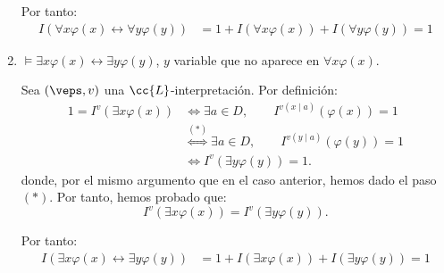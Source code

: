 \begin{ejercicio}
\begin{enumerate}
        Por tanto:
        \begin{align*}
            I( \forall x \varphi(x) \leftrightarrow \forall y \varphi(y))
            &= 1+I(\forall x \varphi(x))+I(\forall y \varphi(y))=1
        \end{align*}
        \item $\models \exists x \varphi(x) \leftrightarrow \exists y \varphi(y)$, $y$ variable que no aparece en $\forall x \varphi(x)$.
        
        
        Sea $(\veps,v)$ una $\cc{L}$-interpretación. Por definición:
        \begin{align*}
            1 = I^v(\exists x \varphi(x))
            &\iff \exists a\in D,\qquad I^{v(x\mid a)}(\varphi(x)) = 1\\
            &\stackrel{(\ast)}{\iff} \exists a\in D,\qquad I^{v(y\mid a)}(\varphi(y)) = 1\\
            &\iff I^v(\exists y \varphi(y)) = 1.
        \end{align*}
        donde, por el mismo argumento que en el caso anterior, hemos dado el paso $(\ast)$.
        Por tanto, hemos probado que:
        \begin{equation*}
            I^v(\exists x \varphi(x)) = I^v(\exists y \varphi(y)).
        \end{equation*}

        Por tanto:
        \begin{align*}
            I( \exists x \varphi(x) \leftrightarrow \exists y \varphi(y))
            &= 1+I(\exists x \varphi(x))+I(\exists y \varphi(y))=1
        \end{align*}
    \end{enumerate}
\end{ejercicio}

